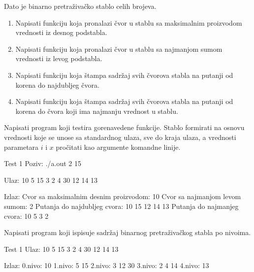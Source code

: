 \begin{Answer}[ref=710]
\end{Answer}




\begin{Exercise}[label=711]
Dato je binarno pretraživačko stablo celih brojeva.
\begin{enumerate}
\item Napisati funkciju koja pronalazi čvor u stablu sa maksimalnim proizvodom vrednosti iz desnog podstabla.
\item Napisati funkciju koja pronalazi čvor u stablu sa najmanjom sumom vrednosti iz levog podstabla.
\item Napisati funkciju  koja štampa sadržaj svih čvorova stabla na putanji od korena do najdubljeg čvora.
\item Napisati funkciju koja štampa sadržaj svih čvorova stabla na putanji od korena do čvora koji ima najmanju vrednost u stablu.
\end{enumerate}
Napisati program koji testira gorenavedene funkcije. Stablo formirati na osnovu vrednosti koje se unose
sa standardnog ulaza, sve do kraja ulaza, a vrednosti parametara $i$ i $x$ pročitati kao argumente komandne linije. 


\begin{maxitest}
\begin{test}{Test 1}
Poziv: ./a.out 2 15

Ulaz: 
10 5 15 3 2 4 30 12 14 13

Izlaz: 
Cvor sa maksimalnim desnim proizvodom: 10
Cvor sa najmanjom levom sumom: 2
Putanja do najdubljeg cvora: 10 15 12 14 13
Putanja do najmanjeg cvora: 10 5 3 2
\end{test}
\end{maxitest}
\end{Exercise}

\begin{Answer}[ref=711]
\end{Answer}


\begin{Exercise}[label=712]
Napisati program koji ispisuje sadržaj binarnog pretraživačkog stabla po nivoima. 

\begin{maxitest}
\begin{test}{Test 1}
Ulaz: 
10 5 15 3 2 4 30 12 14 13

Izlaz: 
0.nivo: 10
1.nivo: 5 15
2.nivo: 3 12 30
3.nivo: 2 4 14
4.nivo: 13
\end{test}
\end{maxitest}

\end{Exercise}

